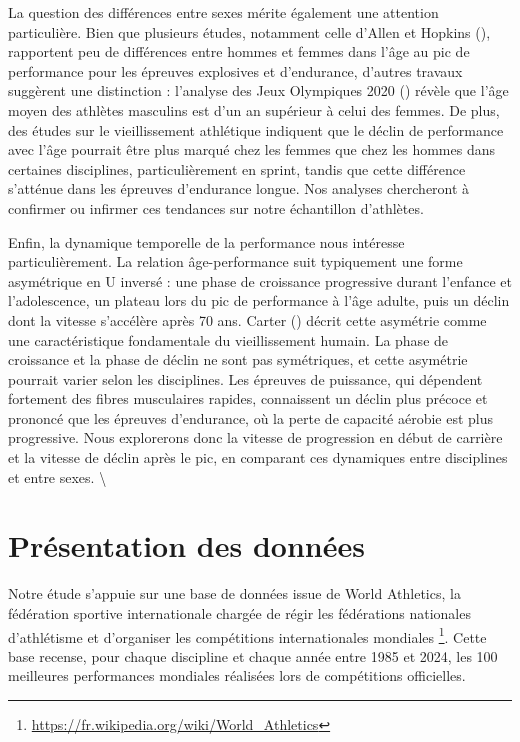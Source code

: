 \documentclass[
  french,
  11pt,
  a4paper,
]{article}
\begin{document}
La question des différences entre sexes mérite également une attention
particulière. Bien que plusieurs études, notamment celle d'Allen et
Hopkins (), rapportent
peu de différences entre hommes et femmes dans l'âge au pic de
performance pour les épreuves explosives et d'endurance, d'autres
travaux suggèrent une distinction : l'analyse des Jeux Olympiques 2020
() révèle que l'âge
moyen des athlètes masculins est d'un an supérieur à celui des femmes.
De plus, des études sur le vieillissement athlétique indiquent que le
déclin de performance avec l'âge pourrait être plus marqué chez les
femmes que chez les hommes dans certaines disciplines, particulièrement
en sprint, tandis que cette différence s'atténue dans les épreuves
d'endurance longue. Nos analyses chercheront à confirmer ou infirmer ces
tendances sur notre échantillon d'athlètes.

Enfin, la dynamique temporelle de la performance nous intéresse
particulièrement. La relation âge-performance suit typiquement une forme
asymétrique en U inversé : une phase de croissance progressive durant
l'enfance et l'adolescence, un plateau lors du pic de performance à
l'âge adulte, puis un déclin dont la vitesse s'accélère après 70 ans.
Carter () décrit cette
asymétrie comme une caractéristique fondamentale du vieillissement
humain. La phase de croissance et la phase de déclin ne sont pas
symétriques, et cette asymétrie pourrait varier selon les disciplines.
Les épreuves de puissance, qui dépendent fortement des fibres
musculaires rapides, connaissent un déclin plus précoce et prononcé que
les épreuves d'endurance, où la perte de capacité aérobie est plus
progressive. Nous explorerons donc la vitesse de progression en début de
carrière et la vitesse de déclin après le pic, en comparant ces
dynamiques entre disciplines et entre sexes. \textbackslash{}

\newpage

\section{Présentation des données}\label{pruxe9sentation-des-donnuxe9es}

Notre étude s'appuie sur une base de données issue de World Athletics,
la fédération sportive internationale chargée de régir les fédérations
nationales d'athlétisme et d'organiser les compétitions internationales
mondiales
\footnote{\url{https://fr.wikipedia.org/wiki/World_Athletics}}. Cette
base recense, pour chaque discipline et chaque année entre 1985 et 2024,
les 100 meilleures performances mondiales réalisées lors de compétitions
officielles.\\
\end{document}

